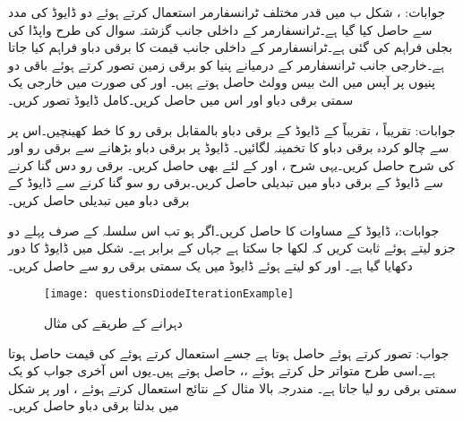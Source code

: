 جوابات: ،  
شکل  ب میں قدر مختلف ٹرانسفارمر استعمال کرتے ہوئے دو ڈایوڈ کی مدد سے  حاصل کیا گیا ہے۔ٹرانسفارمر کے داخلی جانب گزشتہ سوال کی طرح واپڈا کی بجلی فراہم کی گئی ہے۔ٹرانسفارمر کے داخلی جانب   قیمت کا برقی دباو فراہم کیا جاتا ہے۔خارجی جانب ٹرانسفارمر کے درمیانے پنیا کو برقی زمین تصور کرتے ہوئے  باقی دو پنیوں پر آپس میں الٹ بیس وولٹ حاصل ہوتے ہیں۔ اور  کی صورت میں خارجی یک سمتی برقی دباو  اور اس میں  حاصل کریں۔کامل ڈایوڈ تصور کریں۔

جوابات: تقریباً  ، تقریباً 
 کے ڈایوڈ کے برقی دباو بالمقابل برقی رو کا خط کھینچیں۔اس پر سے چالو کردہ برقی دباو کا تخمینہ لگائیں۔ 
ڈایوڈ پر برقی دباو  بڑھانے سے برقی رو  اور  کی شرح حاصل کریں۔یہی شرح ،  اور  کے لئے بھی حاصل کریں۔   
برقی رو دس گنا کرنے سے ڈایوڈ کے برقی دباو میں تبدیلی حاصل کریں۔برقی رو سو گنا کرنے سے ڈایوڈ کے برقی دباو میں تبدیلی حاصل کریں۔

جوابات:،  
ڈایوڈ کے مساوات  کا  حاصل کریں۔اگر  ہو تب اس سلسلہ کے صرف پہلے دو جزو لیتے ہوئے ثابت کریں کہ  لکھا جا سکتا ہے جہاں  کے برابر ہے۔ 
شکل  میں ڈایوڈ کا دور دکھایا گیا ہے۔ اور  کو  لیتے ہوئے ڈایوڈ میں یک سمتی برقی رو  سے حاصل کریں۔
\begin{figure}
\centering
\texttt{[image: questionsDiodeIterationExample]}
\caption{دہرانے کے طریقے کی مثال}
\label{شکل_ڈایوڈ_دہرانے_کا_طریقہ}
\end{figure}

جواب: تصور کرتے ہوئے  حاصل ہوتا ہے جسے استعمال کرتے ہوئے  کی قیمت  حاصل ہوتا ہے۔اسی طرح متواتر حل کرتے ہوئے ،،  حاصل ہوتے ہیں۔یوں اس آخری جواب کو یک سمتی برقی رو لیا جاتا ہے۔    
مندرجہ بالا مثال کے نتائج استعمال کرتے ہوئے ،  اور  پر شکل میں بدلتا برقی دباو  حاصل کریں۔

